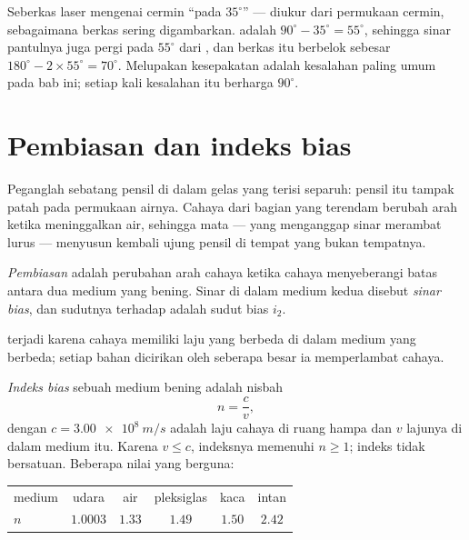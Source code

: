 \begin{example}\label{ex:g10:refraction:mirror}
Seberkas laser mengenai cermin ``pada $35^\circ$'' --- diukur dari
permukaan cermin, sebagaimana berkas sering digambarkan. 
adalah $90^\circ - 35^\circ = 55^\circ$, sehingga sinar pantulnya juga
pergi pada $55^\circ$ dari , dan berkas itu berbelok sebesar
$180^\circ - 2 \times 55^\circ = 70^\circ$. Melupakan kesepakatan  adalah kesalahan paling umum pada bab ini; setiap kali kesalahan
itu berharga $90^\circ$.
\end{example}

\section{Pembiasan dan indeks bias}

Peganglah sebatang pensil di dalam gelas yang terisi separuh: pensil itu
tampak patah pada permukaan airnya. Cahaya dari bagian yang terendam
berubah arah ketika meninggalkan air, sehingga mata --- yang menganggap
sinar merambat lurus --- menyusun kembali ujung pensil di tempat yang
bukan tempatnya.

\begin{definition}[Pembiasan]\label{def:g10:refraction:refraction}
\emph{Pembiasan} adalah perubahan arah cahaya ketika
cahaya menyeberangi batas antara dua medium yang bening. Sinar di dalam
medium kedua disebut \emph{sinar bias}, dan sudutnya
terhadap  adalah sudut bias $i_2$.
\end{definition}

 terjadi karena cahaya memiliki laju yang berbeda di dalam
medium yang berbeda; setiap bahan dicirikan oleh seberapa besar ia
memperlambat cahaya.

\begin{definition}\label{def:g10:refraction:index}
\emph{Indeks bias} sebuah medium bening adalah
nisbah
\[
n = \frac{c}{v},
\]
dengan $c = \qty{3.00e8}{m/s}$ adalah laju cahaya di ruang hampa dan $v$
lajunya di dalam medium itu. Karena $v \leq c$, indeksnya memenuhi
$n \geq 1$; indeks tidak bersatuan. Beberapa nilai yang berguna:
\begin{center}
\begin{tabular}{lccccc}
medium & udara & air & pleksiglas & kaca & intan \\
$n$ & $1.0003$ & $1.33$ & $1.49$ & $1.50$ & $2.42$ \\
\end{tabular}
\end{center}
\end{definition}

